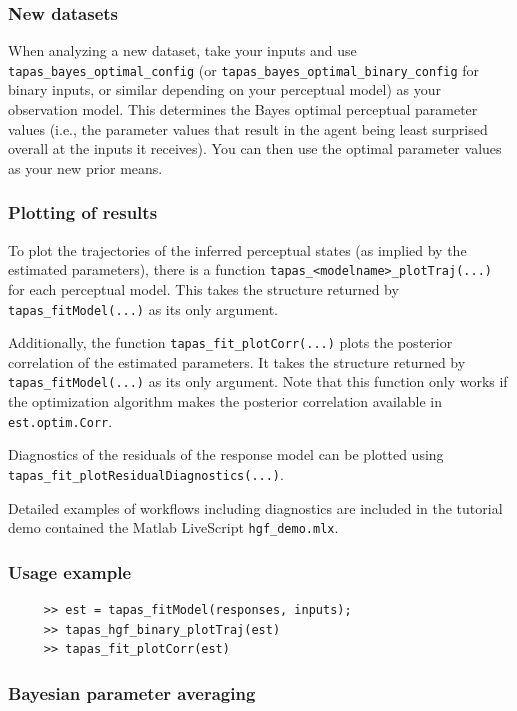 \documentclass[11pt,a4paper]{article}
\numberwithin{equation}{section}
\begin{document}
\subsubsection{New datasets}

When analyzing a new dataset, take your inputs and use
\texttt{tapas\_bayes\_optimal\_config} (or
\texttt{tapas\_bayes\_optimal\_binary\_config} for binary inputs, or
similar depending on your perceptual model) as your observation
model. This determines the Bayes optimal perceptual parameter values
(i.e., the parameter values that result in the agent being least
surprised overall at the inputs it receives). You can then use the
optimal parameter values as your new prior means.

\subsubsection{Plotting of results}

To plot the trajectories of the inferred perceptual states (as implied
by the estimated parameters), there is a function
\texttt{tapas\_<modelname>\_plotTraj(...)} for each perceptual
model. This takes the structure returned by
\texttt{tapas\_fitModel(...)} as its only argument.

Additionally, the function \texttt{tapas\_fit\_plotCorr(...)} plots
the posterior correlation of the estimated parameters. It takes the
structure returned by \texttt{tapas\_fitModel(...)} as its only
argument. Note that this function only works if the optimization
algorithm makes the posterior correlation available in
\texttt{est.optim.Corr}.

Diagnostics of the residuals of the response model can be plotted
using \linebreak\texttt{tapas\_fit\_plotResidualDiagnostics(...)}.

Detailed examples of workflows including diagnostics are included in
the tutorial demo contained the Matlab LiveScript
\texttt{hgf\_demo.mlx}.

\subsubsection{Usage example}

\begin{verbatim}
     >> est = tapas_fitModel(responses, inputs);
     >> tapas_hgf_binary_plotTraj(est)
     >> tapas_fit_plotCorr(est)
\end{verbatim}

\subsubsection{Bayesian parameter averaging}
\end{document}
